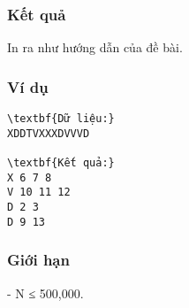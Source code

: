 \subsubsection{   Kết quả  }

   In ra như hướng dẫn của đề bài.  

\subsubsection{   Ví dụ  }
\begin{verbatim}
\textbf{Dữ liệu:}
XDDTVXXXDVVVD

\textbf{Kết quả:}
X 6 7 8
V 10 11 12
D 2 3
D 9 13
\end{verbatim}

\subsubsection{   Giới hạn  }

   - N ≤ 500,000.  

